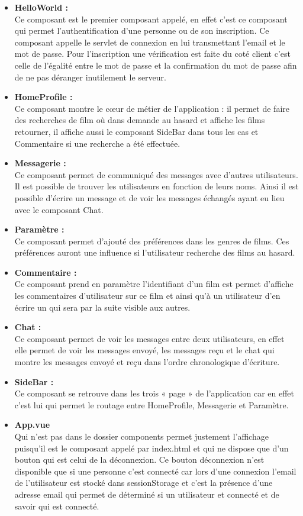 \documentclass[12pt]{article}
\begin{document}
\begin{itemize}
    \item \textbf{HelloWorld :}\\
	Ce composant est le premier composant appelé, en effet c’est ce composant qui permet l’authentification d’une personne ou de son inscription. Ce composant appelle le servlet de connexion en lui transmettant l’email et le mot de passe. Pour l’inscription une vérification est faite du coté client c’est celle de l’égalité entre le mot de passe et la confirmation du mot de passe afin de ne pas déranger inutilement le serveur.
	\item \textbf{HomeProfile :}\\
	Ce composant montre le cœur de métier de l’application : il permet de faire des recherches de film où dans demande au hasard et affiche les films retourner, il affiche aussi le composant SideBar dans tous les cas et Commentaire si une recherche a été effectuée.
	\item \textbf{Messagerie :} \\
	Ce composant permet de communiqué des messages avec d’autres utilisateurs. Il est possible de trouver les utilisateurs en fonction de leurs noms. Ainsi il est possible d’écrire un message et de voir les messages échangés ayant eu lieu avec le composant Chat.
	\item\textbf{ Paramètre :} \\
	Ce composant permet d’ajouté des préférences dans les genres de films. Ces préférences auront une influence si l’utilisateur recherche des films au hasard.
    \item \textbf{Commentaire : } \\
    Ce composant prend en paramètre l’identifiant d’un film est permet d’affiche les commentaires d’utilisateur sur ce film et ainsi qu’à un utilisateur d’en écrire un qui sera par la suite visible aux autres.
    \item \textbf{Chat :}\\
	Ce composant permet de voir les messages entre deux utilisateurs, en effet elle permet de voir les messages envoyé, les messages reçu et le chat qui montre les messages envoyé et reçu dans l’ordre chronologique d’écriture.
    \item \textbf{SideBar :}\\
	Ce composant se retrouve dans les trois « page » de l’application car en effet c’est lui qui permet le routage entre HomeProfile, Messagerie et Paramètre.
    \item \textbf{App.vue}\\
    Qui n’est pas dans le dossier components permet justement l’affichage puisqu’il est le composant appelé par index.html et qui ne dispose que d’un bouton qui est celui de la déconnexion. Ce bouton déconnexion n’est disponible que si une personne c’est connecté car lors d’une connexion l’email de l’utilisateur est stocké dans sessionStorage et c’est la présence d’une adresse email qui permet de déterminé si un utilisateur et connecté et de savoir qui est connecté.
\end{itemize}
\end{document}
